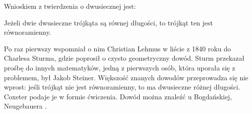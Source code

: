 %

Wnioskiem z twierdzenia o dwusiecznej jest:

\begin{theorem}
    \label{theorem_steiner_lehmus}%
	Jeżeli dwie dwusieczne trójkąta są równej długości, to trójkąt ten jest równoramienny.
\end{theorem}

Po raz pierwszy wspomniał o nim Christian Lehmus w liście z 1840 roku do Charlesa Sturma, gdzie poprosił o czysto geometryczny dowód.
%
%
Sturm przekazał prośbę do innych matematyków, jedną z pierwszych osób, która uporała się z problemem, był Jakob Steiner.
%
Większość znanych dowodów przeprowadza się nie wprost: jeśli trójkąt nie jest równoramienny, to ma dwusieczne różnej długości.
Coxeter \cite[s. 9]{coxeter_1991} podaje je w formie ćwiczenia.
Dowód można znaleźć u Bogdańskiej, Neugebauera \cite[s. 74]{neugebauer_2018}.

%